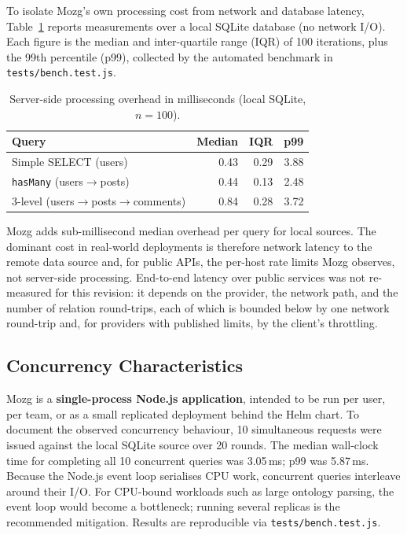 \documentclass[sigconf,nonacm]{acmart}
\begin{document}
To isolate Mozg's own processing cost from network and database latency,
Table~\ref{tab:bench} reports measurements over a local SQLite database
(no network I/O).  Each figure is the median and inter-quartile range
(IQR) of 100 iterations, plus the 99th percentile (p99), collected by
the automated benchmark in \texttt{tests/bench.test.js}.

\begin{table}[h]
\caption{Server-side processing overhead in milliseconds (local SQLite,
  $n=100$).}
\label{tab:bench}
\small
\begin{tabular}{lrrr}
\toprule
Query & Median & IQR & p99 \\
\midrule
Simple SELECT (users) & 0.43 & 0.29 & 3.88 \\
\texttt{hasMany} (users$\to$posts) & 0.44 & 0.13 & 2.48 \\
3-level (users$\to$posts$\to$comments) & 0.84 & 0.28 & 3.72 \\
\bottomrule
\end{tabular}
\end{table}

Mozg adds sub-millisecond median overhead per query for local sources.
The dominant cost in real-world deployments is therefore network latency
to the remote data source and, for public APIs, the per-host rate limits
Mozg observes, not server-side processing.  End-to-end latency over
public services was not re-measured for this revision: it depends on
the provider, the network path, and the number of relation round-trips,
each of which is bounded below by one network round-trip and, for
providers with published limits, by the client's throttling.

\subsection{Concurrency Characteristics}

Mozg is a \textbf{single-process Node.js application}, intended to be
run per user, per team, or as a small replicated deployment behind the
Helm chart.  To document the observed concurrency behaviour, 10
simultaneous requests were issued against the local SQLite source over
20 rounds.  The median wall-clock time for completing all 10 concurrent
queries was 3.05\,ms; p99 was 5.87\,ms.  Because the Node.js event loop
serialises CPU work, concurrent queries interleave around their I/O.
For CPU-bound workloads such as large ontology parsing, the event loop
would become a bottleneck; running several replicas is the recommended
mitigation.  Results are reproducible via \texttt{tests/bench.test.js}.
\end{document}
